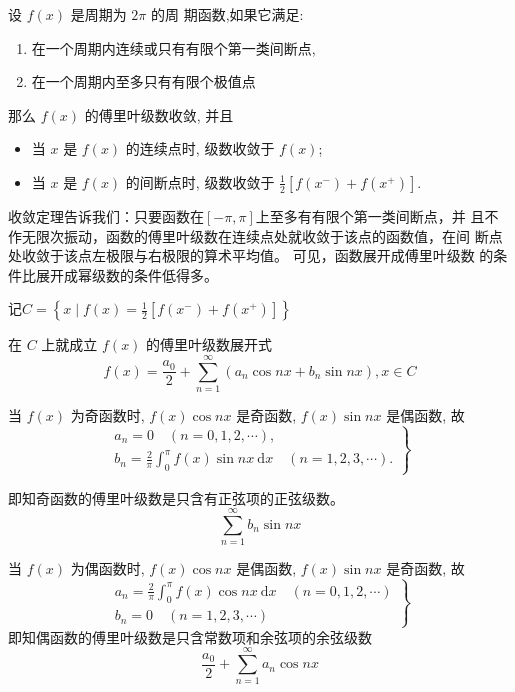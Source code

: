 \begin{theorem}
    设 $ f(x) $ 是周期为 $ 2 \pi $ 的周 期函数,如果它满足:

    \begin{enumerate}
        \item 在一个周期内连续或只有有限个第一类间断点,
        \item 在一个周期内至多只有有限个极值点
    \end{enumerate}

    那么 $ f(x) $ 的傅里叶级数收敛, 并且

    \begin{itemize}
    \item 当 $ x $ 是 $ f(x) $ 的连续点时, 级数收敛于 $ f(x) $;
    \item 当 $ x $ 是 $ f(x) $ 的间断点时, 级数收敛于 $ \frac{1}{2}\left[f\left(x^{-}\right)+f\left(x^{+}\right)\right] $.
    \end{itemize}
\end{theorem}

收敛定理告诉我们：只要函数在$[-\pi,\pi]$上至多有有限个第一类间断点，并
且不作无限次振动，函数的傅里叶级数在连续点处就收敛于该点的函数值，在间
断点处收敛于该点左极限与右极限的算术平均值。 可见，函数展开成傅里叶级数
的条件比展开成幂级数的条件低得多。 

\begin{corollary}
    记$
C=\left\{x \mid f(x)=\frac{1}{2}\left[f\left(x^{-}\right)+f\left(x^{+}\right)\right]\right\}
$

在 $ C $ 上就成立 $ f(x) $ 的傅里叶级数展开式
$$
f(x)=\frac{a_{0}}{2}+\sum_{n=1}^{\infty}\left(a_{n} \cos n x+b_{n} \sin n x\right), x \in C
$$
\end{corollary}

\begin{definition}[正弦级数]
    当 $ f(x) $ 为奇函数时, $ f(x) \cos n x $ 是奇函数, $ f(x) \sin n x $ 是偶函数, 故
$$
\left.\begin{array}{l}
a_{n}=0 \quad(n=0,1,2, \cdots), \\
b_{n}=\frac{2}{\pi} \int_{0}^{\pi} f(x) \sin n x \mathrm{~d} x \quad(n=1,2,3, \cdots) .
\end{array}\right\}
$$

即知奇函数的傅里叶级数是只含有正弦项的正弦级数。
$$ \sum_{n=1}^{\infty} b_{n} \sin n x $$
\end{definition}

\begin{definition}[余弦级数]
    当 $ f(x) $ 为偶函数时, $ f(x) \cos n x $ 是偶函数, $ f(x) \sin n x $ 是奇函数, 故
$$
\left.\begin{array}{l}
a_{n}=\frac{2}{\pi} \int_{0}^{\pi} f(x) \cos n x \mathrm{~d} x \quad(n=0,1,2, \cdots) \\
b_{n}=0 \quad(n=1,2,3, \cdots)
\end{array}\right\}
$$
即知偶函数的傅里叶级数是只含常数项和余弦项的余弦级数
$$
\frac{a_{0}}{2}+\sum_{n=1}^{\infty} a_{n} \cos n x
$$
\end{definition}

